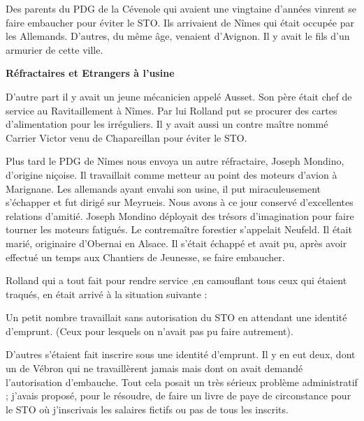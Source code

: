 \vspace{0.45cm}

Des parents du PDG de la Cévenole qui avaient une vingtaine d’années vinrent se faire
embaucher pour éviter le STO. Ils arrivaient de Nîmes qui était occupée par les Allemands.
D’autres, du même âge, venaient d’Avignon. Il y avait le fils d’un armurier de cette ville.

\vspace{0.55cm}

\textbf{Réfractaires et Etrangers à l’usine}

\vspace{0.35cm}

D’autre part il y avait un jeune mécanicien appelé Ausset. Son père était chef de service au
Ravitaillement à Nîmes. Par lui Rolland put se procurer des cartes d’alimentation pour les
irréguliers. Il y avait aussi un contre maître nommé Carrier Victor venu de Chapareillan pour
éviter le STO.

\vspace{0.45cm}

Plus tard le PDG de Nîmes nous envoya un autre réfractaire, Joseph Mondino, d’origine
niçoise. Il travaillait comme metteur au point des moteurs d’avion à Marignane. Les
allemands ayant envahi son usine, il put miraculeusement s’échapper et fut dirigé sur
Meyrueis. Nous avons à ce jour conservé d’excellentes relations d’amitié. Joseph Mondino
déployait des trésors d’imagination pour faire tourner les moteurs fatigués. Le contremaître
forestier s’appelait Neufeld. Il était marié, originaire d’Obernai en Alsace. Il s’était échappé
et avait pu, après avoir effectué un temps aux Chantiers de Jeunesse, se faire embaucher.

\vspace{0.45cm}

Rolland qui a tout fait pour rendre service ,en camouflant tous ceux qui étaient traqués, en
était arrivé à la situation suivante :


Un petit nombre travaillait sans autorisation du STO en attendant une identité d’emprunt.
(Ceux pour lesquels on n’avait pas pu faire autrement).

\vspace{0.45cm}

D’autres s’étaient fait inscrire sous une identité d’emprunt. Il y en eut deux, dont un de
Vébron qui ne travaillèrent jamais mais dont on avait demandé l’autorisation d’embauche.
Tout cela posait un très sérieux problème administratif ; j’avais proposé, pour le résoudre, de
faire un livre de paye de circonstance pour le STO où j’inscrivais les salaires fictifs ou pas de
tous les inscrits.

